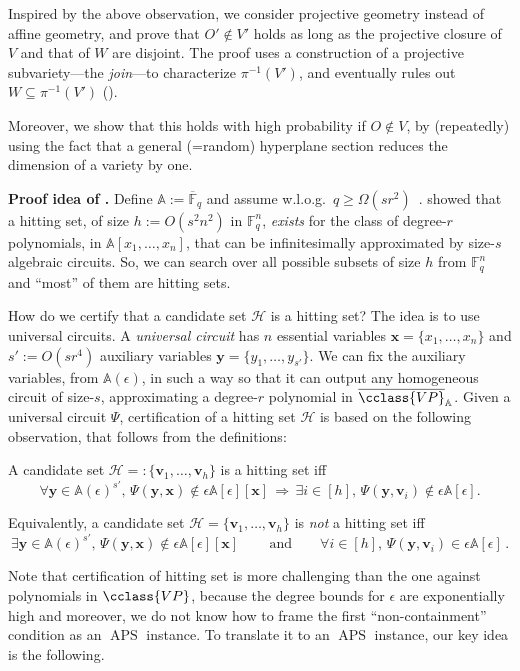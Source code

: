 \documentclass{toc}
\newcommand{\F}{\mathbb{F}}
\newcommand{\calH}{\mathcal{H}}
\newcommand{\aff}{\mathbb{A}}
\newcommand{\ol}[1]{\overline{#1}}
\newcommand{\VP}{\cclass{VP}\xspace}  %
\newcommand{\VPbar}{\overline{\VP}\xspace}  %
\DeclareMathOperator{\APS}{\mathrm{APS}\xspace} %
\begin{document}
Inspired by the above observation, we consider projective geometry instead of affine geometry, and prove that $O'\not\in V'$ holds as long as the projective closure of $V$ and that of $W$ are disjoint. The proof uses a construction of a projective subvariety---the \emph{join}---to characterize $\pi^{-1}(V')$, and eventually rules out $W\subseteq \pi^{-1}(V')$ ().

Moreover, we show that this holds with high probability if 
%
$O\not\in V$, by (repeatedly) using the fact that a general (=random) %
hyperplane section reduces the dimension of a variety by one.

\smallskip\noindent
\textbf{Proof idea of .} 
Define $\aff:=\ol{\F}_q$ and assume w.l.o.g.\ $q\ge\Omega(sr^{2})$~\cite{AL86}.
\cite[Theorem~4.4]{heintz1980testing} showed that a hitting set, of size $h:= O(s^2n^2)$ in $\F_q^n$, \emph{exists} for the class of degree-$r$ polynomials, in $\aff[x_1,\dots,x_n]$, that can be infinitesimally approximated by size-$s$ algebraic circuits. So, we can search over all possible subsets of size $h$ from $\F_q^n$ and ``most'' of them are hitting sets.

How do we certify that a candidate set $\calH$ is a hitting set? The idea is to use universal circuits. A \emph{universal circuit} has $n$ essential variables $\mathbf x=\{x_1,\ldots,x_n\}$ and $s':=O(sr^4)$ auxiliary variables $\mathbf y= \{y_1,\ldots, y_{s'}\}$. We can fix the auxiliary variables, from $\aff(\epsilon)$, in such a way so that it can output any homogeneous circuit of size-$s$, approximating a degree-$r$ polynomial in
%
$\VPbar_\aff$.   %
Given a universal circuit $\Psi$, certification of a hitting set $\calH$ is based on the following observation, that follows from the definitions: 

%
A candidate set %
$\calH=: \{\mathbf v_1,\ldots, \mathbf v_h\}$ is a hitting set iff
\[
  \forall \mathbf y\in \aff(\epsilon)^{s'}, \,\Psi(\mathbf{y,x})\notin \epsilon\aff[\epsilon][\mathbf x]  \,\Rightarrow\, \exists i\in[h],\,  \Psi(\mathbf y, \mathbf v_i)\notin \epsilon\aff[\epsilon].
\]

\smallskip
%
Equivalently, a candidate set %
$\calH= \{\mathbf v_1,\ldots, \mathbf v_h\}$ is \emph{not} a hitting set iff
\[
  \exists \mathbf y\in \aff(\epsilon)^{s'}, \,\Psi(\mathbf{y,x})\notin \epsilon\aff[\epsilon][\mathbf x]\,\qquad\text{and}\qquad  \forall i\in[h],\,  \Psi(\mathbf y, \mathbf v_i)\in \epsilon\aff[\epsilon]\,.
\]

\smallskip
Note that certification of hitting set is more challenging than the one against polynomials in
%
$\VP$,  %
because the degree bounds for $\epsilon$ are exponentially high and moreover, we do not know how to frame the first ``non-containment'' condition as an $\APS$ instance. To translate it to an $\APS$ instance, our key idea is the following. 
\end{document}
